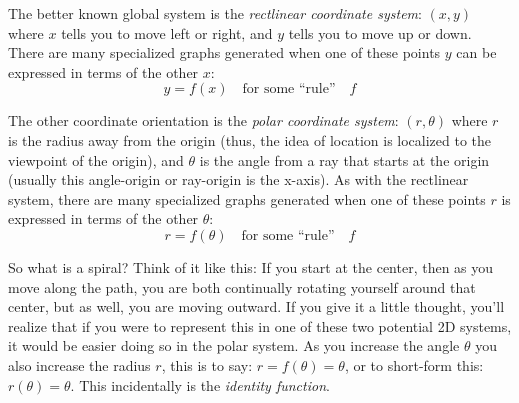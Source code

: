 \documentclass[twoside]{article}
\begin{document}
The better known global system is the \emph{rectlinear coordinate system}: $ (x,y) $ where $ x $ tells you to move left
or right, and $ y $ tells you to move up or down.  There are many specialized graphs generated when one of these points
$ y $ can be expressed in terms of the other $ x $:
$$ y=f(x)\quad\mbox{for some ``rule''}\quad f $$

The other coordinate orientation is the \emph{polar coordinate system}: $ (r, \theta) $ where $ r $ is the radius
away from the origin (thus, the idea of location is localized to the viewpoint of the origin), and $ \theta $ is
the angle from a ray that starts at the origin (usually this angle-origin or ray-origin is the x-axis). As with the
rectlinear system, there are many specialized graphs generated when one of these points $ r $ is expressed in terms
of the other $ \theta $:
$$ r=f(\theta)\quad\mbox{for some ``rule''}\quad f $$

So what is a spiral? Think of it like this: If you start at the center, then as you move along the path, you are both
continually rotating yourself around that center, but as well, you are moving outward. If you give it a little thought,
you'll realize that if you were to represent this in one of these two potential 2D systems, it would be easier doing
so in the polar system. As you increase the angle $ \theta $ you also increase the radius $ r $, this is to say:
$ r=f(\theta)=\theta $, or to short-form this: $ r(\theta)=\theta $. This incidentally is the \emph{identity function}.
\end{document}
